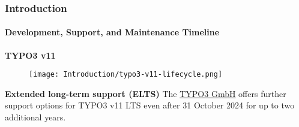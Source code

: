 %

\begin{frame}[fragile]
	\frametitle{Introduction}
	\framesubtitle{Development, Support, and Maintenance Timeline}

	\textbf{TYPO3 v11}

	\begin{figure}
		\texttt{[image: Introduction/typo3-v11-lifecycle.png]}
	\end{figure}

	\textbf{Extended long-term support (ELTS)}\newline
	\smaller
		The \href{https://typo3.com}{TYPO3 GmbH} offers further support options
		for TYPO3 v11 LTS even after 31 October 2024 for up to two additional
		years.
	\normalsize

\end{frame}

